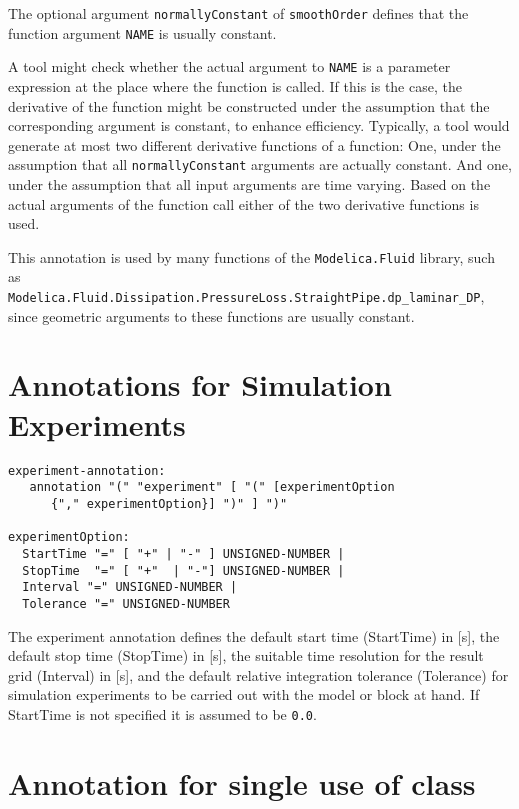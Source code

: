 The optional argument \lstinline!normallyConstant! of \lstinline!smoothOrder! defines that the
function argument \lstinline!NAME! is usually constant.

\begin{nonnormative}
A tool might check whether the actual argument to \lstinline!NAME! is a parameter expression at the place where the
function is called. If this is the case, the derivative of the function might be constructed under the assumption that
the corresponding argument is constant, to enhance efficiency.  Typically, a tool would generate at most two different
derivative functions of a function: One, under the assumption that all \lstinline!normallyConstant! arguments are
actually constant. And one, under the assumption that all input arguments are time varying.  Based on the actual
arguments of the function call either of the two derivative functions is used.

This annotation is used by many functions of the \lstinline!Modelica.Fluid! library, such as\\
\lstinline!Modelica.Fluid.Dissipation.PressureLoss.StraightPipe.dp_laminar_DP!, since geometric
arguments to these functions are usually constant.
\end{nonnormative}

\section{Annotations for Simulation Experiments}\label{annotations-for-simulation-experiments}
\begin{lstlisting}[language=grammar]
experiment-annotation:
   annotation "(" "experiment" [ "(" [experimentOption
      {"," experimentOption}] ")" ] ")"

experimentOption:
  StartTime "=" [ "+" | "-" ] UNSIGNED-NUMBER |
  StopTime  "=" [ "+"  | "-"] UNSIGNED-NUMBER |
  Interval "=" UNSIGNED-NUMBER |
  Tolerance "=" UNSIGNED-NUMBER
\end{lstlisting}

The experiment annotation defines the default start time (StartTime) in
  {[}s{]}, the default stop time (StopTime) in {[}s{]}, the suitable time
  resolution for the result grid (Interval) in {[}s{]}, and the default
relative integration tolerance (Tolerance) for simulation experiments to
be carried out with the model or block at hand. If StartTime is not specified it is assumed to be \lstinline!0.0!.

\section{Annotation for single use of class}\label{annotation-for-single-use-of-class}

